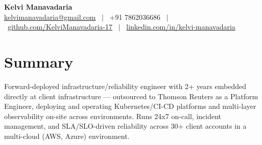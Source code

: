 \documentclass[a4paper,10.999999pt]{article}
\begin{document}
    \pagestyle{empty}



    \begin{center}
    \LARGE{\textbf{Kelvi Manavadaria}} \\[1.5pt]
    {\small
    \href{mailto:kelvimanavadaria@gmail.com}{kelvimanavadaria@gmail.com} \ $|$ \
    +91 7862036686 \ $|$ \
    \href{https://github.com/KelviManavadaria-17}{github.com/KelviManavadaria-17} \ $|$ \
    \href{https://www.linkedin.com/in/kelvi-manavadaria/}{linkedin.com/in/kelvi-manavadaria}
    }
    \end{center}

    \vspace{0.5pt}


    \section{Summary}
Forward-deployed infrastructure/reliability engineer with 2+ years embedded directly at client infrastructure — outsourced to Thomson Reuters as a Platform Engineer, deploying and operating Kubernetes/CI-CD platforms and multi-layer observability on-site across environments. Runs 24x7 on-call, incident management, and SLA/SLO-driven reliability across 30+ client accounts in a multi-cloud (AWS, Azure) environment.

\end{document}

